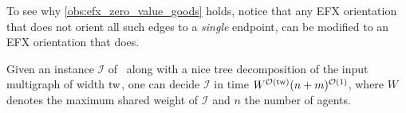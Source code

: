 To see why \cref{obs:efx_zero_value_goods} holds, notice that any EFX orientation that does not orient all such edges to a \emph{single} endpoint,
can be modified to an EFX orientation that does.

\begin{theoremrep}[\appsymb]\label{thm:EFX:tw}
    Given an instance $\mathcal{I}$ of \EFXmc\ along with a nice tree decomposition of the input multigraph of width $\mathrm{tw}$,
    one can decide $\mathcal{I}$ in time $W^{\mathcal{O}(\mathrm{tw})} (n + m)^{\mathcal{O}(1)}$,
    where $W$ denotes the maximum shared weight of $\mathcal{I}$ and $n$ the number of agents.
\end{theoremrep}



